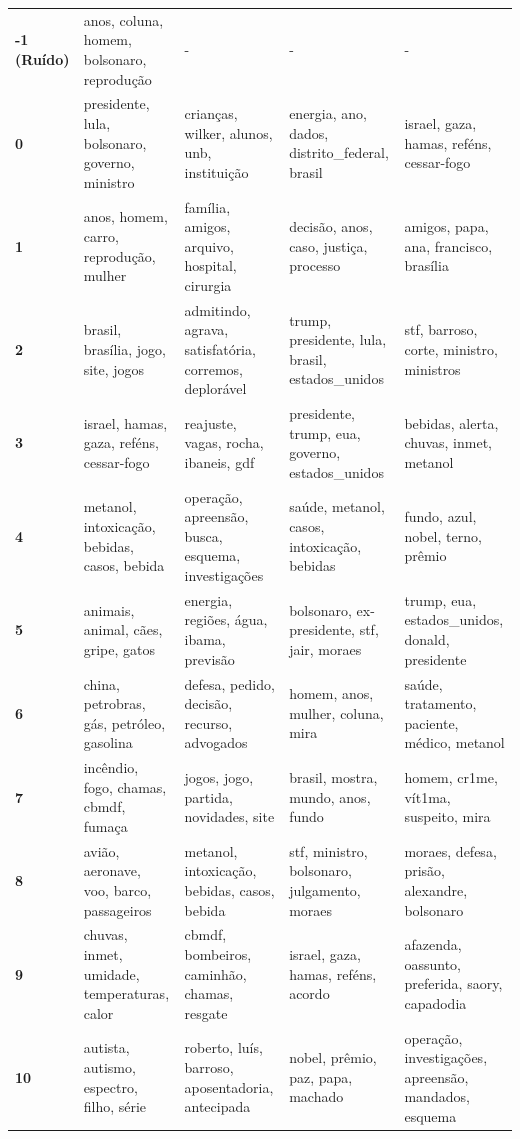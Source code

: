 \begin{xltabular}{\textwidth}{@{}l >{\RaggedRight\arraybackslash}X >{\RaggedRight\arraybackslash}X >{\RaggedRight\arraybackslash}X >{\RaggedRight\arraybackslash}X@{}}
    \textbf{-1 (Ruído)} & anos, coluna, homem, bolsonaro, reprodução & - & - & - \\
    \textbf{0} & presidente, lula, bolsonaro, governo, ministro & crianças, wilker, alunos, unb, instituição & energia, ano, dados, distrito\_federal, brasil & israel, gaza, hamas, reféns, cessar-fogo \\
    \textbf{1} & anos, homem, carro, reprodução, mulher & família, amigos, arquivo, hospital, cirurgia & decisão, anos, caso, justiça, processo & amigos, papa, ana, francisco, brasília \\
    \textbf{2} & brasil, brasília, jogo, site, jogos & admitindo, agrava, satisfatória, corremos, deplorável & trump, presidente, lula, brasil, estados\_unidos & stf, barroso, corte, ministro, ministros \\
    \textbf{3} & israel, hamas, gaza, reféns, cessar-fogo & reajuste, vagas, rocha, ibaneis, gdf & presidente, trump, eua, governo, estados\_unidos & bebidas, alerta, chuvas, inmet, metanol \\
    \textbf{4} & metanol, intoxicação, bebidas, casos, bebida & operação, apreensão, busca, esquema, investigações & saúde, metanol, casos, intoxicação, bebidas & fundo, azul, nobel, terno, prêmio \\
    \textbf{5} & animais, animal, cães, gripe, gatos & energia, regiões, água, ibama, previsão & bolsonaro, ex-presidente, stf, jair, moraes & trump, eua, estados\_unidos, donald, presidente \\
    \textbf{6} & china, petrobras, gás, petróleo, gasolina & defesa, pedido, decisão, recurso, advogados & homem, anos, mulher, coluna, mira & saúde, tratamento, paciente, médico, metanol \\
    \textbf{7} & incêndio, fogo, chamas, cbmdf, fumaça & jogos, jogo, partida, novidades, site & brasil, mostra, mundo, anos, fundo & homem, cr1me, vít1ma, suspeito, mira \\
    \textbf{8} & avião, aeronave, voo, barco, passageiros & metanol, intoxicação, bebidas, casos, bebida & stf, ministro, bolsonaro, julgamento, moraes & moraes, defesa, prisão, alexandre, bolsonaro \\
    \textbf{9} & chuvas, inmet, umidade, temperaturas, calor & cbmdf, bombeiros, caminhão, chamas, resgate & israel, gaza, hamas, reféns, acordo & afazenda, oassunto, preferida, saory, capadodia \\
    \textbf{10} & autista, autismo, espectro, filho, série & roberto, luís, barroso, aposentadoria, antecipada & nobel, prêmio, paz, papa, machado & operação, investigações, apreensão, mandados, esquema \\

\end{xltabular}
